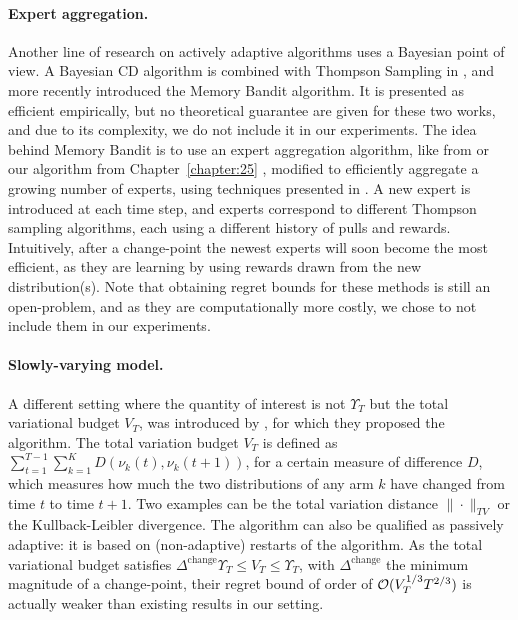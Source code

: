 \paragraph{Expert aggregation.}
%
Another line of research on actively adaptive algorithms uses a Bayesian point of view.
A Bayesian CD algorithm is combined with Thompson Sampling in \cite{MellorShapiro13},
and more recently \cite{Alami17} introduced the Memory Bandit algorithm.
It is presented as efficient empirically, but no theoretical guarantee are given for these two works, and due to its complexity, we do not include it in our experiments.
The idea behind Memory Bandit is to use an expert aggregation algorithm, like \ExpFour{} from \cite{Auer02} or our \Aggr{} algorithm from Chapter~\ref{chapter:25} \cite{Besson2018WCNC}, modified to efficiently aggregate a growing number of experts, using techniques presented in \cite{Mourtada17}.
%
A new expert is introduced at each time step, and experts correspond to different Thompson sampling algorithms, each using a different history of pulls and rewards. Intuitively, after a change-point the newest experts will soon become the most efficient, as they are learning by using rewards drawn from the new distribution(s).
%
Note that obtaining regret bounds for these methods is still an open-problem,
and as they are computationally more costly, we chose to not include them in our experiments.


\paragraph{Slowly-varying model.}

A different setting where the quantity of interest is not $\Upsilon_T$ but the total variational budget $V_T$, was introduced by \cite{Besbes14stochastic}, for which they proposed the \RExpThree{} algorithm.
The total variation budget $V_T$ is defined as $\sum_{t=1}^{T-1} \sum_{k=1}^K D(\nu_k(t), \nu_k(t+1))$, for a certain measure of difference $D$, which measures how much the two distributions of any arm $k$ have changed from time $t$ to time $t+1$.
Two examples can be the total variation distance $\|\cdot\|_{TV}$ or the Kullback-Leibler divergence.
%
The \RExpThree{} algorithm can also be qualified as passively adaptive: it is based on (non-adaptive) restarts of the \ExpThree{} algorithm.
As the total variational budget satisfies $\Delta^{\text{change}} \Upsilon_T \leq V_T \leq \Upsilon_T$, with $\Delta^{\text{change}}$ the minimum magnitude of a change-point,
their regret bound of order of $\mathcal{O}(V_T^{1/3} T^{2/3})$ is actually weaker than existing results in our setting.

